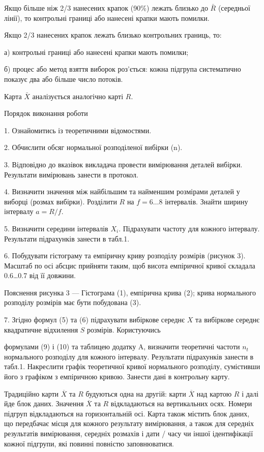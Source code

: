 Якщо більше ніж 2/3 нанесених крапок (90\%) лежать близько до $\bar{R}$ (середньої лінії), то контрольні границі або нанесені крапки мають помилки.

Якщо 2/3 нанесених крапок лежать близько контрольних границь, то:

а) контрольні границі або нанесені крапки мають помилки;

б) процес або метод взяття виборок роз’ється: кожна підгрупа систематично показує два або більше число потоків.

Карта $\bar{X}$ аналізується аналогічно карті $R$.

Порядок виконання роботи

1. Ознайомитись із теоретичними відомостями.

2. Обчислити обсяг нормальної розподіленої вибірки (n).

3. Відповідно до вказівок викладача провести вимірювання деталей вибірки. Результати вимірювань занести в протокол.

4. Визначити значення між найбільшим та найменшим розмірами деталей у виборці (розмах вибірки). Розділити $R$ на $f = 6 \ldots 8$ інтервалів. Знайти ширину інтервалу $a = R / f$.

5. Визначити середини інтервалів $X_i$. Підрахувати частоту для кожного інтервалу. Результати підрахунків занести в табл.1.

6. Побудувати гістограму та емпіричну криву розподілу розмірів (рисунок 3). Масштаб по осі абсцис прийняти таким, щоб висота емпіричної кривої складала 0.6\ldots 0.7 від її довжини.

Пояснення рисунка 3 — Гістограма (1), емпірична крива (2); крива нормального розподілу розмірів має бути побудована (3).

7. Згідно формул (5) та (6) підрахувати вибіркове середнє $X$ та вибіркове середнє квадратичне відхилення $S$ розмірів. Користуючись

формулами (9) і (10) та таблицею додатку A, визначити теоретичні частоти $n_t$ нормального розподілу для кожного інтервалу. Результати підрахунків занести в табл.1. Накреслити графік теоретичної кривої нормального розподілу, сумістивши його з графіком з емпіричною кривою. Занести дані в контрольну карту.

Традиційно карти $\overline{X}$ та $R$ будуються одна на другій: карти $\overline{X}$ над картою $R$ і далі йде блок даних. Значення $\overline{X}$ та $R$ відкладаються на вертикальних осях. Номери підгруп відкладаються на горизонтальній осі. Карта також містить блок даних, що передбачає місця для кожного результату вимірювання, а також для середніх результатів вимірювання, середніх розмахів і дати / часу чи іншої ідентифікації кожної підгрупи, які повинні повністю заповнюватися.

